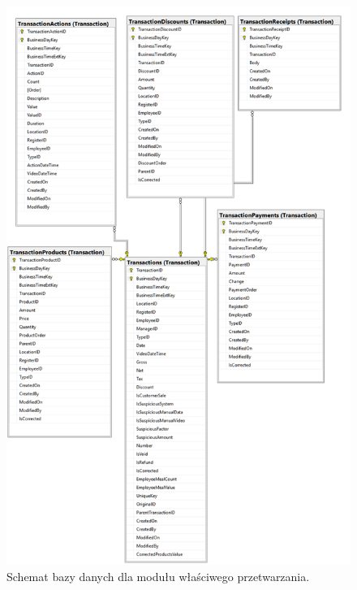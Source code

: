 \documentclass[a4paper]{book}
\begin{document}
\begin{figure}[t]
	\centering
	\includegraphics{./img/parser_database_schema.png}
	\caption{Schemat bazy danych dla modułu właściwego przetwarzania.}
	\label{fig:parser_database_schema}
\end{figure} 
\end{document}
